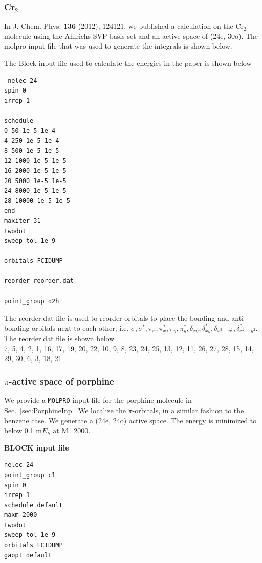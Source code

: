 \documentclass[letterpaper,12pt,aps, pra]{revtex4-1}
\begin{document}
\subsubsection{Cr$_2$}\label{sec:cr2}

In J. Chem. Phys. \textbf{136} (2012), 124121, we published a calculation on
the Cr$_2$ molecule using the Ahlrichs SVP basis set and an active space of
(24e, 30o). The molpro input file that was used to generate the integrals is
shown below. 

The Block input file used to calculate the energies in the paper is shown below
\begin{verbatim}
 nelec 24
spin 0
irrep 1

schedule
0 50 1e-5 1e-4
4 250 1e-5 1e-4
8 500 1e-5 1e-5
12 1000 1e-5 1e-5
16 2000 1e-5 1e-5
20 5000 1e-5 1e-5
24 8000 1e-5 1e-5
28 10000 1e-5 1e-5
end
maxiter 31
twodot
sweep_tol 1e-9

orbitals FCIDUMP

reorder reorder.dat

point_group d2h
\end{verbatim}

The reorder.dat file is used to reorder orbitals to place the bonding and anti-bonding orbitals next to each other, i.e. {$\sigma, \sigma^*, \pi_x, \pi_x^*, \pi_y, \pi_y^*, \delta_{xy}, \delta_{xy}^*, \delta_{x^2-y^2}, \delta_{x^2-y^2}^*$}. The reorder.dat file is shown below\\

 7,  5,  4,  2,  1,
16, 17, 19, 20, 22,
10,  9,  8, 23, 24,
25, 13, 12, 11, 26,
27, 28, 15, 14, 29,
30,  6,  3, 18, 21            

\subsubsection{$\pi$-active space of porphine}

We provide a \texttt{MOLPRO} input file for the porphine molecule in Sec.~\ref{sec:PorphineInp}. We localize the $\pi$-orbitals, in a similar fashion to the 
benzene case. We generate a (24e, 24o) active space. The energy is minimized to 
below 0.1 m$E_h$ at M=2000.

\textbf{BLOCK input file}
\begin{verbatim}
nelec 24
point_group c1
spin 0
irrep 1
schedule default
maxm 2000
twodot
sweep_tol 1e-9
orbitals FCIDUMP
gaopt default
\end{verbatim}
\end{document}
